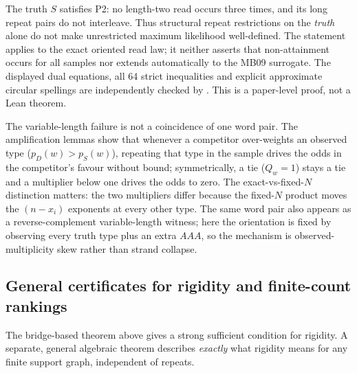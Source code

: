 The truth $S$ satisfies P2: no length-two read occurs
three times, and its long repeat pairs do not interleave.
Thus structural repeat restrictions on the \emph{truth}
alone do not make unrestricted maximum likelihood
well-defined. The statement applies to the exact oriented
read law; it neither asserts that non-attainment occurs
for all samples nor extends automatically to the MB09
surrogate. The displayed dual equations, all 64 strict
inequalities and explicit approximate circular spellings
are independently checked by
.
This is a paper-level proof, not a Lean theorem.

\begin{remark}
\label{rem:amplification}
The variable-length failure is not a coincidence of one word pair. The
amplification lemmas show that whenever a competitor over-weights an observed
type ($p_D(w)>p_S(w)$), repeating that type in the sample drives the odds in the
competitor's favour without bound; symmetrically, a tie ($Q_w=1$) stays a tie
and a multiplier below one drives the odds to zero. The
exact-vs-fixed-$N$ distinction matters: the two multipliers differ because the
fixed-$N$ product moves the $(n-x_i)$ exponents at every other type. The same
word pair also appears as a reverse-complement variable-length witness; here the
orientation is fixed by observing every truth type plus an extra $AAA$, so the
mechanism is observed-multiplicity skew rather than strand collapse.
\end{remark}

\subsection{General certificates for rigidity and finite-count rankings}
\label{sec:finite:certificates}

The bridge-based theorem above gives a strong sufficient condition for
rigidity. A separate, general algebraic theorem describes \emph{exactly}
what rigidity means for any finite support graph, independent of repeats.

